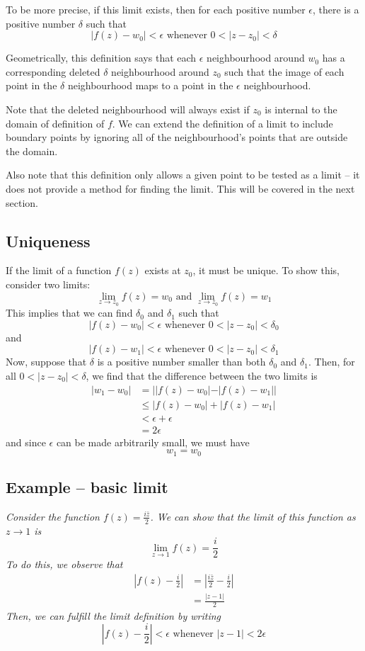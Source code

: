\documentclass{article}
\begin{document}
To be more precise, if this limit exists, then for each positive number $\epsilon$, there is a positive number $\delta$ such that
\[
	|f(z) - w_0| < \epsilon \text{ whenever } 0 < |z - z_0| < \delta
\]

Geometrically, this definition says that each $\epsilon$ neighbourhood around $w_0$ has a corresponding deleted $\delta$ neighbourhood around $z_0$ such that the image of each point in the $\delta$ neighbourhood maps to a point in the $\epsilon$ neighbourhood.

Note that the deleted neighbourhood will always exist if $z_0$ is internal to the domain of definition of $f$. We can extend the definition of a limit to include boundary points by ignoring all of the neighbourhood's points that are outside the domain.

Also note that this definition only allows a given point to be tested as a limit -- it does not provide a method for finding the limit. This will be covered in the next section.

\subsection{Uniqueness}
If the limit of a function $f(z)$ exists at $z_0$, it must be unique. To show this, consider two limits:
\[
	\lim_{z \to z_0} f(z) = w_0 \text{ and } \lim_{z \to z_0} f(z) = w_1
\]
This implies that we can find $\delta_0$ and $\delta_1$ such that
\[
	|f(z) - w_0| < \epsilon \text{ whenever } 0 < |z - z_0| < \delta_0
\]
and
\[
	|f(z) - w_1| < \epsilon \text{ whenever } 0 < |z - z_0| < \delta_1
\]
Now, suppose that $\delta$ is a positive number smaller than both $\delta_0$ and $\delta_1$. Then, for all $0 < |z - z_0| < \delta$, we find that the difference between the two limits is
\begin{align*}
	|w_1 - w_0| &= ||f(z) - w_0| - |f(z) - w_1|| \\
	& \le |f(z) - w_0| + |f(z) - w_1| \\
	& < \epsilon + \epsilon \\
	& = 2\epsilon
\end{align*}
and since $\epsilon$ can be made arbitrarily small, we must have
\[
	w_1 = w_0
\] 


\subsection{Example -- basic limit}
\textit{
Consider the function $f(z) = \frac{i \bar{z}}{2}$. We can show that the limit of this function as $z \to 1$ is
\[
	\lim_{z \to 1} f(z) = \frac{i}{2}
\]
To do this, we observe that
\begin{align*}
	\left| f(z) - \frac{i}{2} \right| 
	&= \left| \frac{i \bar{z}}{2} - \frac{i}{2} \right| \\
	&= \frac{|z - 1|}{2}
\end{align*}
Then, we can fulfill the limit definition by writing
\[
	\left| f(z) - \frac{i}{2} \right| < \epsilon \text{ whenever } \left| z - 1\right| < 2\epsilon
\]
}
\end{document}
